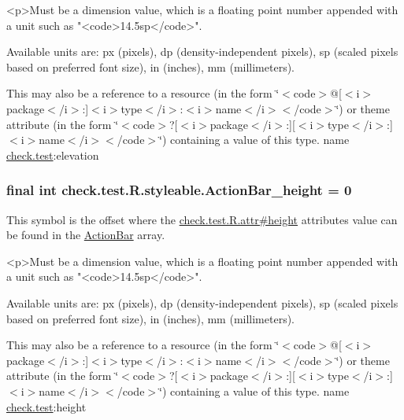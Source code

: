 \begin{DoxyVerb}      <p>Must be a dimension value, which is a floating point number appended with a unit such as "<code>14.5sp</code>".
\end{DoxyVerb}
 Available units are\+: px (pixels), dp (density-\/independent pixels), sp (scaled pixels based on preferred font size), in (inches), mm (millimeters). 

This may also be a reference to a resource (in the form \char`\"{}$<$code$>$@\mbox{[}$<$i$>$package$<$/i$>$\+:\mbox{]}$<$i$>$type$<$/i$>$\+:$<$i$>$name$<$/i$>$$<$/code$>$\char`\"{}) or theme attribute (in the form \char`\"{}$<$code$>$?\mbox{[}$<$i$>$package$<$/i$>$\+:\mbox{]}\mbox{[}$<$i$>$type$<$/i$>$\+:\mbox{]}$<$i$>$name$<$/i$>$$<$/code$>$\char`\"{}) containing a value of this type.  name \hyperlink{namespacecheck_1_1test}{check.\+test}\+:elevation \hypertarget{classcheck_1_1test_1_1_r_1_1styleable_a1ad8ab9094975d894200659bb15e67fd}{}
\subsubsection[{Action\+Bar\+\_\+height}]{\setlength{\rightskip}{0pt plus 5cm}final int check.\+test.\+R.\+styleable.\+Action\+Bar\+\_\+height = 0\hspace{0.3cm}{\ttfamily [static]}}\label{classcheck_1_1test_1_1_r_1_1styleable_a1ad8ab9094975d894200659bb15e67fd}
This symbol is the offset where the \hyperlink{classcheck_1_1test_1_1_r_1_1attr_ad0373977141facd56b9a985852b9a5c4}{check.\+test.\+R.\+attr\#height} attribute\textquotesingle{}s value can be found in the \hyperlink{classcheck_1_1test_1_1_r_1_1styleable_ad0a4d403cb244ea4d22c6f6ebf2c2cdf}{Action\+Bar} array.

\begin{DoxyVerb}      <p>Must be a dimension value, which is a floating point number appended with a unit such as "<code>14.5sp</code>".
\end{DoxyVerb}
 Available units are\+: px (pixels), dp (density-\/independent pixels), sp (scaled pixels based on preferred font size), in (inches), mm (millimeters). 

This may also be a reference to a resource (in the form \char`\"{}$<$code$>$@\mbox{[}$<$i$>$package$<$/i$>$\+:\mbox{]}$<$i$>$type$<$/i$>$\+:$<$i$>$name$<$/i$>$$<$/code$>$\char`\"{}) or theme attribute (in the form \char`\"{}$<$code$>$?\mbox{[}$<$i$>$package$<$/i$>$\+:\mbox{]}\mbox{[}$<$i$>$type$<$/i$>$\+:\mbox{]}$<$i$>$name$<$/i$>$$<$/code$>$\char`\"{}) containing a value of this type.  name \hyperlink{namespacecheck_1_1test}{check.\+test}\+:height \hypertarget{classcheck_1_1test_1_1_r_1_1styleable_a62a234e7f0069b54f7bc50a087a598a6}{}
